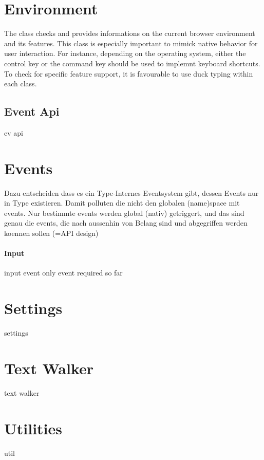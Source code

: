 
\section{Environment}

The  class checks and provides informations on the current browser environment and its features. This class is especially important to mimick native behavior for user interaction. For instance, depending on the operating system, either the control key or the command key should be used to implemnt keyboard shortcuts. To check for specific feature support, it is favourable to use duck typing within each class.

\subsection{Event Api}
ev api

\section{Events}
\label{sec:events}

Dazu entscheiden dass es ein Type-Internes Eventsystem gibt, dessen Events nur in Type existieren. Damit polluten die nicht den globalen (name)space mit events. Nur bestimmte events werden global (nativ) getriggert, und das sind genau die events, die nach aussenhin von Belang sind und abgegriffen werden koennen sollen (=API design)

\paragraph{Input}
input event only event required so far


\section{Settings}
settings
\section{Text Walker}
text walker
\section{Utilities}
util

